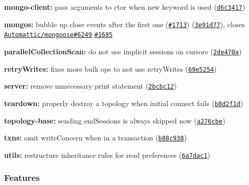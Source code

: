 \begin{DoxyItemize}
\item {\bfseries mongo-\/client\+:} pass arguments to ctor when new keyword is used (\href{https://github.com/mongodb/node-mongodb-native/commit/d6c3417}{\tt d6c3417})
\item {\bfseries mongos\+:} bubble up close events after the first one (\href{https://github.com/mongodb/node-mongodb-native/issues/1713}{\tt \#1713}) (\href{https://github.com/mongodb/node-mongodb-native/commit/3e91d77}{\tt 3e91d77}), closes \href{https://github.com/Automattic/mongoose/issues/6249}{\tt Automattic/mongoose\#6249} \href{https://github.com/mongodb/node-mongodb-native/issues/1685}{\tt \#1685}
\item {\bfseries parallel\+Collection\+Scan\+:} do not use implicit sessions on cursors (\href{https://github.com/mongodb/node-mongodb-native/commit/2de470a}{\tt 2de470a})
\item {\bfseries retry\+Writes\+:} fixes more bulk ops to not use retry\+Writes (\href{https://github.com/mongodb/node-mongodb-native/commit/69e5254}{\tt 69e5254})
\item {\bfseries server\+:} remove unnecessary print statement (\href{https://github.com/mongodb/node-mongodb-native/commit/2bcbc12}{\tt 2bcbc12})
\item {\bfseries teardown\+:} properly destroy a topology when initial connect fails (\href{https://github.com/mongodb/node-mongodb-native/commit/b8d2f1d}{\tt b8d2f1d})
\item {\bfseries topology-\/base\+:} sending {\ttfamily end\+Sessions} is always skipped now (\href{https://github.com/mongodb/node-mongodb-native/commit/a276cbe}{\tt a276cbe})
\item {\bfseries txns\+:} omit write\+Concern when in a transaction (\href{https://github.com/mongodb/node-mongodb-native/commit/b88c938}{\tt b88c938})
\item {\bfseries utils\+:} restructure inheritance rules for read preferences (\href{https://github.com/mongodb/node-mongodb-native/commit/6a7dac1}{\tt 6a7dac1})
\end{DoxyItemize}

\subsubsection*{Features}


